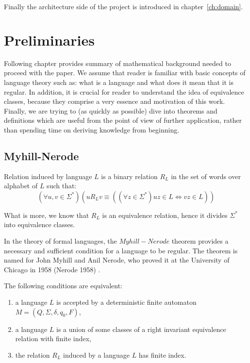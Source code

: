 \documentclass{mini}
\begin{document}
Finally the architecture side of the project is introduced in chapter~\ref{ch:domain}.

\chapter{Preliminaries}\label{chap:prelim}
Following chapter provides summary of mathematical background needed to proceed with the paper. We assume that reader is familiar with basic concepts of language theory such as: what is a language and what does it mean that it is regular. In addition, it is crucial for reader to understand the idea of equivalence classes, because they comprise a very essence and motivation of this work. Finally, we are trying to (as quickly as possible) dive into theorems and definitions which are useful from the point of view of further application, rather than spending time on deriving knowledge from beginning.
\section{Myhill-Nerode}
\begin{definition} \label{def:myhill}
    Relation induced by language $L$ is a binary relation $R_{L}$ in the set of words over alphabet of $L$ such that:
    \[
    (\forall{u,v \in \Sigma^{*}})(u R_{L} v \equiv ((\forall z \in \Sigma^{*}) uz \in L \Leftrightarrow vz \in L))
    \]
\end{definition}
What is more, we know that $R_{L}$ is an equivalence relation, hence it divides $\Sigma^{*}$ into equivalence classes.

In the theory of formal languages, the $Myhill-Nerode$ theorem provides a necessary and sufficient condition for a language to be regular. The theorem is named for John Myhill and Anil Nerode, who proved it at the University of Chicago in 1958 (Nerode 1958) \cite{Myhill_Nerode}.

\begin{theorem}\label{Theorem:Myhill_Nerode}
    The following conditions are equivalent:
    \begin{enumerate}
        \item a language $L$ is accepted by a deterministic finite automaton $M = (Q,\Sigma,\delta,q_0,F)$,
        \item a language $L$ is a union of some classes of a right invariant equivalence relation with finite index,
        \item the relation $R_{L}$ induced by a language $L$ has finite index.
    \end{enumerate}
\end{theorem}
\end{document}
